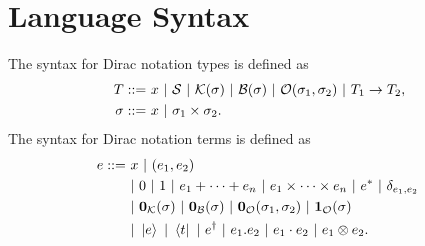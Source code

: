 \documentclass{article}
\newcommand{\yx}[1]{\textit{\color{blue}[YX] : #1}}
\begin{document}






\clearpage


\section{Language Syntax}
\begin{definition}[syntax]
    The syntax for Dirac notation types is defined as 
    \begin{align*}
        T ::=\ & x\ |\ \SType\ |\ \KType(\sigma)\ |\ \BType(\sigma)\ |\ \OType(\sigma_1, \sigma_2)\ |\ T_1 \to T_2, \\
        \sigma ::=\ & x\ |\ \sigma_1 \times \sigma_2.
    \end{align*}
    The syntax for Dirac notation terms is defined as
    \begin{align*}
        e ::=\ & x\ |\ (e_1, e_2) \\
        & |\ 0\ |\ 1\ |\ e_1 + \cdots + e_n \ |\ e_1 \times \cdots \times e_n\ |\ e^* \ |\ \delta_{e_1, e_2}\ \\
        & |\ \mathbf{0}_\mathcal{K}(\sigma)\ |\ \mathbf{0}_\mathcal{B}(\sigma)\ |\ \mathbf{0}_\mathcal{O}(\sigma_1, \sigma_2)\ |\ \mathbf{1}_\mathcal{O}(\sigma) \\
        & |\ \ket{e}\ |\ \bra{t}\ |\ e^\dagger\ |\ e_1.e_2\ |\ e_1 \cdot e_2\ |\ e_1 \otimes e_2.
    \end{align*}
\end{definition}
\end{document}
